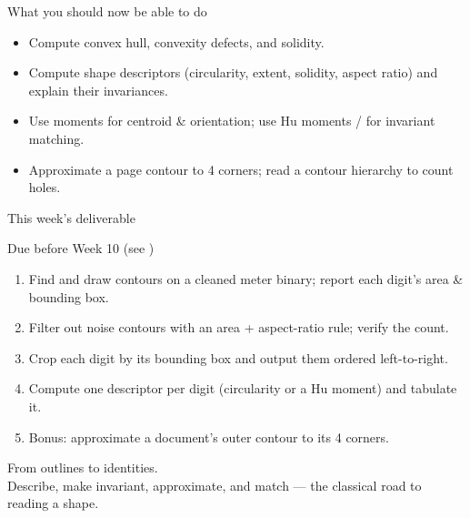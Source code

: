 \documentclass[10pt,aspectratio=169]{beamer}
\begin{document}
\begin{frame}{What you should now be able to do}
  \begin{itemize}
    \item Compute convex hull, convexity defects, and solidity.
    \item Compute shape descriptors (circularity, extent, solidity, aspect ratio) and explain their invariances.
    \item Use moments for centroid \& orientation; use Hu moments /  for invariant matching.
    \item Approximate a page contour to 4 corners; read a contour hierarchy to count holes.
  \end{itemize}
\end{frame}

\begin{frame}{This week's deliverable}
  \begin{alertblock}{Due before Week 10 (see )}
    \begin{enumerate}
      \item Find and draw contours on a cleaned meter binary; report each digit's area \& bounding box.
      \item Filter out noise contours with an area + aspect-ratio rule; verify the count.
      \item Crop each digit by its bounding box and output them ordered left-to-right.
      \item Compute one  descriptor per digit (circularity or a Hu moment) and tabulate it.
      \item Bonus: approximate a document's outer contour to its 4 corners.
    \end{enumerate}
  \end{alertblock}
\end{frame}

\begin{frame}[standout]
  From outlines to identities.\\[4pt]
  \normalsize Describe, make invariant, approximate, and match — the classical road to reading a shape.
\end{frame}
\end{document}
